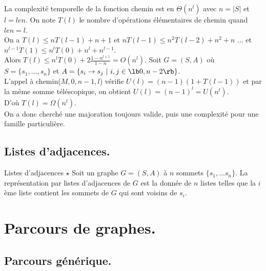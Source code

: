 \documentclass[french, 11pt]{article}
\begin{document}
\begin{prop}{}{}
    La complexité temporelle de la fonction chemin est en $\Theta(n^l)$ avec $n=|S|$ et $l=len$.
    \tcblower
    On note $T(l)$ le nombre d'opérations élémentaires de chemin quand $len=l$.\\
    On a $T(l)\leq nT(l-1)+ n + 1$ et $nT(l-1)\leq n^2T(l-2)+n^2 + n$ ... et $n^{l-1}T(1)\leq n^lT(0)+n^l+n^{l-1}$.\\
    Alors $T(l)\leq n^lT(0) + 2\frac{1-n^{l+1}}{1-n}=O(n^l)$.\n
    Soit $G=(S,A)$ où $S=\{s_1,...,s_n\}$ et $A=\{s_i\to s_j ~ | ~ i,j\in\lb0,n-2\rb\}$.\\
    L'appel à chemin($M, 0, n-1, l$) vérifie $U(l)=(n-1)(1+T(l-1))$ et par la même somme téléscopique, on obtient $U(l)=(n-1)^l=U(n^l)$.\\
    D'où $T(l)=\Omega(n^l)$.\\
    On a donc cherché une majoration toujours valide, puis une complexité pour une famille particulière.
\end{prop}

\subsection{Listes d'adjacences.}

\begin{defi}{Listes d'adjacences $\star$}{}
    Soit un graphe $G=(S,A)$ à $n$ sommets $\{s_1,...s_n\}$. La représentation par listes d'adjacences de $G$ est la donnée de $n$ listes telles que la $i$ème liste contient les sommets de $G$ qui sont voisins de $s_i$.
\end{defi}

\section{Parcours de graphes.}
\subsection{Parcours générique.}
\end{document}

